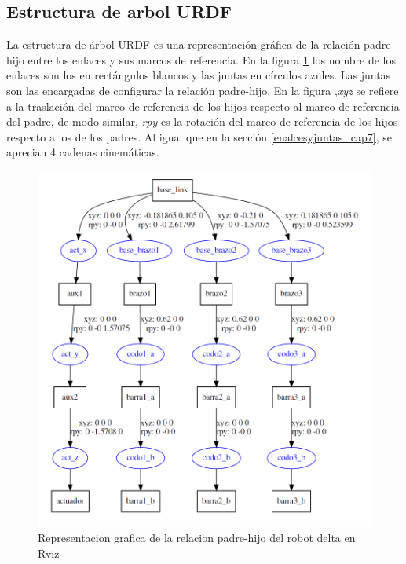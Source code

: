 \newpage

    \subsection{Estructura de arbol URDF}
    La estructura de árbol URDF es una representación gráfica de la relación padre-hijo entre los enlaces y sus marcos de referencia. En la figura \ref{f:cap7_rviz_12341} los nombre de los enlaces son los en rectángulos blancos y las juntas en círculos azules. Las juntas son las encargadas de configurar la relación padre-hijo. En la figura ,\textit{xyz} se refiere a la traslación del marco de referencia de los hijos respecto al marco de referencia del padre, de modo similar, \textit{rpy} es la rotación del marco de referencia de los hijos respecto a los de los padres. Al igual que en la sección \ref{enalcesyjuntas_cap7}, se aprecian 4 cadenas cinemáticas.

        \begin{figure}[h]
            \centering
            \includegraphics[width=1.0\linewidth]{Main/Chapter7/Images7/rviz_1.png}
            \caption{Representacion grafica de la relacion padre-hijo del robot delta en Rviz}
            \label{f:cap7_rviz_12341}
        \end{figure}  
    
